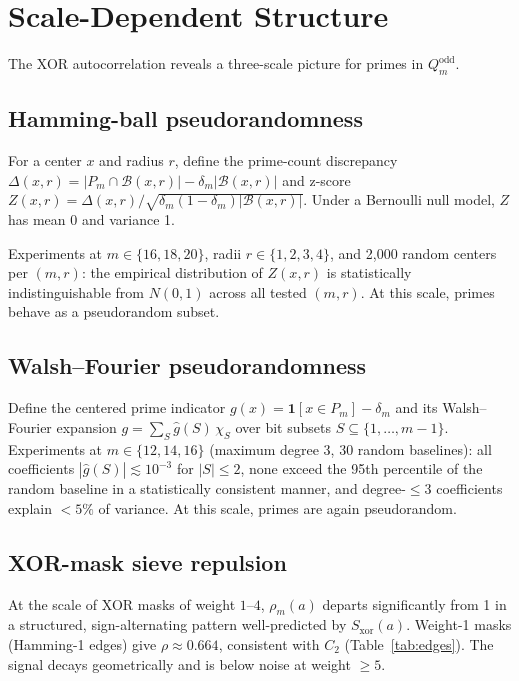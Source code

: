 \documentclass[12pt]{article}
\begin{document}
\section{Scale-Dependent Structure}
\label{sec:scale}

The XOR autocorrelation reveals a three-scale picture for primes in $Q_m^{\mathrm{odd}}$.

\subsection{Hamming-ball pseudorandomness}
\label{sec:balls}

For a center $x$ and radius $r$, define the prime-count discrepancy
$\Delta(x,r) = |P_m \cap \mathcal{B}(x,r)| - \delta_m|\mathcal{B}(x,r)|$
and z-score $Z(x,r) = \Delta(x,r)/\sqrt{\delta_m(1-\delta_m)|\mathcal{B}(x,r)|}$.
Under a Bernoulli null model, $Z$ has mean 0 and variance 1.

Experiments at $m \in \{16,18,20\}$, radii $r \in \{1,2,3,4\}$,
and 2{,}000 random centers per $(m,r)$:
the empirical distribution of $Z(x,r)$ is statistically indistinguishable from $N(0,1)$
across all tested $(m,r)$.
At this scale, primes behave as a pseudorandom subset.

\subsection{Walsh--Fourier pseudorandomness}
\label{sec:fourier}

Define the centered prime indicator $g(x) = \mathbf{1}[x \in P_m] - \delta_m$
and its Walsh--Fourier expansion
$g = \sum_{S} \hat{g}(S)\,\chi_S$ over bit subsets $S \subseteq \{1,\ldots,m-1\}$.
Experiments at $m \in \{12,14,16\}$ (maximum degree 3, 30 random baselines):
all coefficients $|\hat{g}(S)| \lesssim 10^{-3}$ for $|S| \leq 2$,
none exceed the 95th percentile of the random baseline in a statistically
consistent manner, and degree-$\leq 3$ coefficients explain $< 5\%$ of variance.
At this scale, primes are again pseudorandom.

\subsection{XOR-mask sieve repulsion}
\label{sec:edge}

At the scale of XOR masks of weight $1$--$4$, $\rho_m(a)$ departs significantly
from 1 in a structured, sign-alternating pattern well-predicted by $S_{\mathrm{xor}}(a)$.
Weight-1 masks (Hamming-1 edges) give $\rho \approx 0.664$,
consistent with $C_2$ (Table~\ref{tab:edges}).
The signal decays geometrically and is below noise at weight $\geq 5$.
\end{document}

